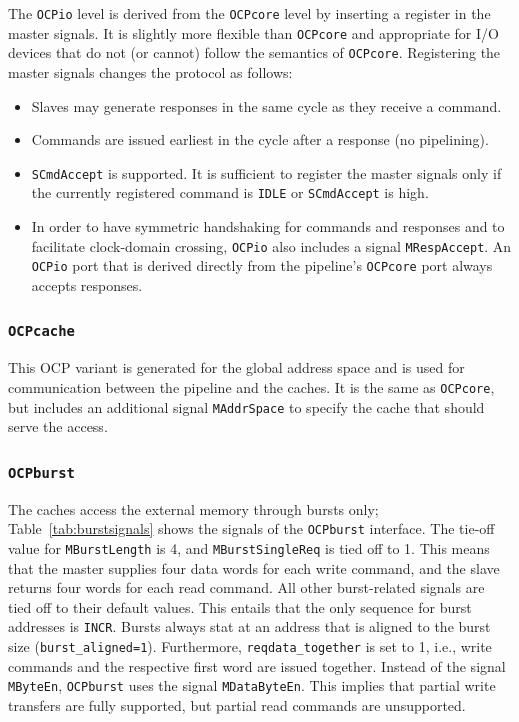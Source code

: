 \documentclass[a4paper,fontsize=10pt,twoside,DIV15,BCOR12mm,headinclude=true,footinclude=false,pagesize,bibtotoc]{scrbook}
\newcommand{\code}[1]{{\texttt{#1}}}
\begin{document}
The \code{OCPio} level is derived from the \code{OCPcore} level by
inserting a register in the master signals. It is slightly more
flexible than \code{OCPcore} and appropriate for I/O devices that do
not (or cannot) follow the semantics of \code{OCPcore}. Registering
the master signals changes the protocol as follows:
\begin{itemize}
\item Slaves may generate responses in the same cycle as they
  receive a command.
\item Commands are issued earliest in the cycle after a response (no
  pipelining).
\item \code{SCmdAccept} is supported. It is sufficient to register the
  master signals only if the currently registered command is
  \code{IDLE} or \code{SCmdAccept} is high.
\item In order to have symmetric handshaking for commands and
  responses and to facilitate clock-domain crossing, \code{OCPio} also
  includes a signal \code{MRespAccept}. An \code{OCPio} port that is
  derived directly from the pipeline's \code{OCPcore} port always
  accepts responses.
\end{itemize}

\subsubsection{\code{OCPcache}}

This OCP variant is generated for the global address space and is used
for communication between the pipeline and the caches. It is the same
as \code{OCPcore}, but includes an additional signal \code{MAddrSpace}
to specify the cache that should serve the access.

\subsubsection{\code{OCPburst}}

The caches access the external memory through bursts only;
Table~\ref{tab:burstsignals} shows the signals of the \code{OCPburst}
interface. The tie-off value for \code{MBurstLength} is 4, and
\code{MBurstSingleReq} is tied off to 1. This means that the master
supplies four data words for each write command, and the slave returns
four words for each read command. All other burst-related signals are
tied off to their default values. This entails that the only sequence
for burst addresses is \code{INCR}. Bursts always stat at an address
that is aligned to the burst size
(\code{burst\_aligned=1}). Furthermore, \code{reqdata\_together} is
set to 1, i.e., write commands and the respective first word are
issued together. Instead of the signal \code{MByteEn}, \code{OCPburst}
uses the signal \code{MDataByteEn}. This implies that partial write
transfers are fully supported, but partial read commands are
unsupported.
\end{document}
